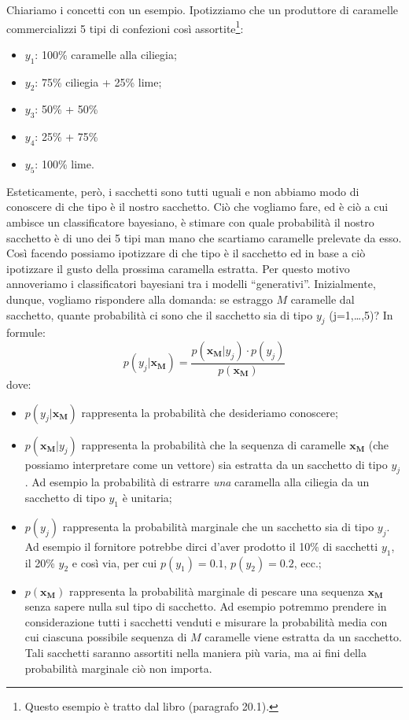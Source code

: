Chiariamo i concetti con un esempio. Ipotizziamo che un produttore di caramelle commercializzi 5 tipi di confezioni così assortite\footnote{Questo esempio è tratto dal libro (paragrafo 20.1).}:
\begin{itemize}
\item $y_1$: 100\% caramelle alla ciliegia;
\item $y_2$: 75\% ciliegia + 25\% lime;
\item $y_3$: 50\% + 50\%
\item $y_4$: 25\% + 75\%
\item $y_5$: 100\% lime.
\end{itemize}
Esteticamente, però, i sacchetti sono tutti uguali e non abbiamo modo di conoscere di che tipo è il nostro sacchetto. Ciò che vogliamo fare, ed è ciò a cui ambisce un classificatore bayesiano, è stimare con quale probabilità il nostro sacchetto è di uno dei 5 tipi man mano che scartiamo caramelle prelevate da esso. Così facendo possiamo ipotizzare di che tipo è il sacchetto ed in base a ciò ipotizzare il gusto della prossima caramella estratta. Per questo motivo annoveriamo i classificatori bayesiani tra i modelli ``generativi''. Inizialmente, dunque, vogliamo rispondere alla domanda: se estraggo $M$ caramelle dal sacchetto, quante probabilità ci sono che il sacchetto sia di tipo $y_j$ (j=1,\dots,5)?
In formule:
\begin{equation*}
p(y_j|\mathbf{x_M}) = \frac{p(\mathbf{x_M}|y_j) \cdot p(y_j)}{p(\mathbf{x_M})}
\end{equation*}
dove:
\begin{itemize}
\item $p(y_j|\mathbf{x_M})$ rappresenta la probabilità che desideriamo conoscere;
\item $p(\mathbf{x_M}|y_j)$ rappresenta la probabilità che la sequenza di caramelle $\mathbf{x_M}$ (che possiamo interpretare come un vettore) sia estratta da un sacchetto di tipo $y_j$. Ad esempio la probabilità di estrarre \emph{una} caramella alla ciliegia da un sacchetto di tipo $y_1$ è unitaria;
\item $p(y_j)$ rappresenta la probabilità marginale che un sacchetto sia di tipo $y_j$. Ad esempio il fornitore potrebbe dirci d'aver prodotto il 10\% di sacchetti $y_1$, il 20\% $y_2$ e così via, per cui $p(y_1)=0.1$, $p(y_2)=0.2$, ecc.;
\item $p(\mathbf{x_M})$ rappresenta la probabilità marginale di pescare una sequenza $\mathbf{x_M}$ senza sapere nulla sul tipo di sacchetto. Ad esempio potremmo prendere in considerazione tutti i sacchetti venduti e misurare la probabilità media con cui ciascuna possibile sequenza di $M$ caramelle viene estratta da un sacchetto. Tali sacchetti saranno assortiti nella maniera più varia, ma ai fini della probabilità marginale ciò non importa.
\end{itemize}

